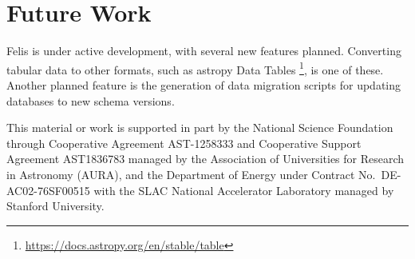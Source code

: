 \documentclass[11pt,twoside]{article}
\begin{document}
\section{Future Work}

Felis is under active development, with several new features planned.
Converting tabular data to other formats, such as astropy Data Tables \footnote{\url{https://docs.astropy.org/en/stable/table}}, is one of these.
Another planned feature is the generation of data migration scripts for updating databases to new schema versions.

\acknowledgments This material or work is supported in part by the National Science Foundation through Cooperative Agreement AST-1258333 and Cooperative Support Agreement AST1836783 managed by the Association of Universities for Research in Astronomy (AURA), and the Department of Energy under Contract No.\ DE-AC02-76SF00515 with the SLAC National Accelerator Laboratory managed by Stanford University.


\end{document}
